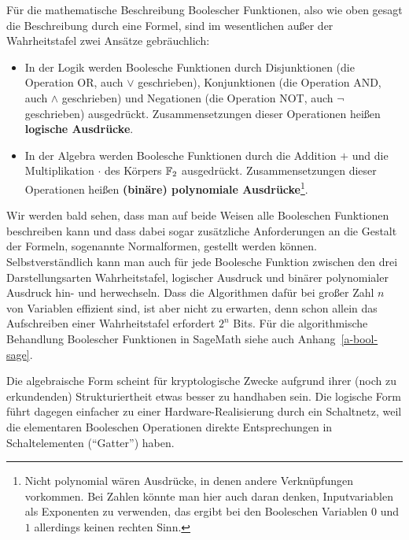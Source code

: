 \begin{refsegment}
Für die mathematische Beschreibung Boolescher Funktionen, also wie
oben gesagt die Beschreibung durch eine Formel, sind im wesentlichen
außer der Wahrheitstafel zwei Ansätze gebräuchlich:
\begin{itemize}
   \item In der Logik werden Boolesche Funktionen durch Disjunktionen
      (die Operation OR, auch $\vee$ geschrieben), Konjunktionen
      (die Operation AND, auch $\wedge$ geschrieben) und Negationen
      (die Operation NOT, auch $\neg$ geschrieben) ausgedrückt.
      Zusammensetzungen dieser Operationen heißen \textbf{logische
      Ausdrücke}.
   \item In der Algebra werden Boolesche Funktionen durch die
      Addition $+$ und die Multiplikation $\cdot$ des Körpers $\mathbb{F}_2$
      ausgedrückt. Zusammensetzungen dieser Operationen heißen
      \textbf{(binäre) polynomiale
      Ausdrücke}\footnote{%
        Nicht polynomial wären Ausdrücke, in denen andere Verknüpfungen
        vorkommen. Bei Zahlen könnte man hier auch daran denken,
        Inputvariablen als Exponenten zu verwenden, das ergibt bei den
        Booleschen Variablen $0$ und $1$ allerdings keinen rechten Sinn.
      }.
\end{itemize}
Wir werden bald sehen, dass man auf beide Weisen alle Booleschen
Funktionen
beschreiben kann und dass dabei sogar zusätzliche Anforderungen
an die Gestalt der Formeln, sogenannte Normalformen, gestellt werden
können. Selbstverständlich kann man auch für jede Boolesche Funktion
zwischen den drei Darstellungsarten Wahrheitstafel, logischer Ausdruck
und binärer polynomialer Ausdruck hin- und herwechseln. Dass die
Algorithmen dafür bei großer Zahl $n$ von Variablen effizient sind,
ist aber nicht zu erwarten, denn schon allein das Aufschreiben einer
Wahrheitstafel erfordert $2^n$ Bits. Für die algorithmische Behandlung
Boolescher Funktionen in SageMath siehe auch Anhang~\ref{a-bool-sage}.

Die algebraische Form scheint für kryptologische Zwecke aufgrund ihrer
(noch zu erkundenden)
Strukturiertheit etwas besser zu handhaben sein. Die logische Form führt
dagegen einfacher zu einer Hardware-Realisierung durch ein Schaltnetz,
weil die elementaren Booleschen Operationen direkte Entsprechungen
in Schaltelementen ("`Gatter"') haben.


\end{refsegment}
